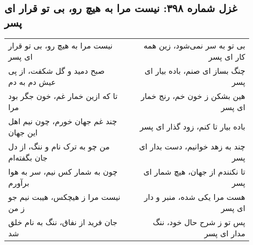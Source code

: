 \begin{center}
\section*{غزل شماره ۳۹۸: نیست مرا به هیچ رو، بی تو قرار ای پسر}
\label{sec:398}
\begin{longtable}{l p{0.5cm} r}
نیست مرا به هیچ رو، بی تو قرار ای پسر
&&
بی تو به سر نمی‌شود، زین همه کار ای پسر
\\
صبح دمید و گل شکفت، از پی عیش دم به دم
&&
چنگ بساز ای صنم، باده بیار ای پسر
\\
تا که ازین خمار غم، خون جگر بود مرا
&&
هین بشکن ز خون خم، رنج خمار ای پسر
\\
چند غم جهان خورم، چون نیم اهل این جهان
&&
باده بیار تا کنم، زود گذار ای پسر
\\
من چو به ترک نام و ننگ، از دل جان بگفته‌ام
&&
چند به زهد خوانیم، دست بدار ای پسر
\\
چون به شمار کس نیم، سر به هوا برآورم
&&
تا نکنندم از جهان، هیچ شمار ای پسر
\\
نیست مرا ز هیچکس، هیبت نیم جو ز من
&&
هست مرا یکی شده، منبر و دار ای پسر
\\
جان فرید از نفاق، ننگ به نام خلق شد
&&
پس تو ز شرح حال خود، ننگ مدار ای پسر
\\
\end{longtable}
\end{center}
